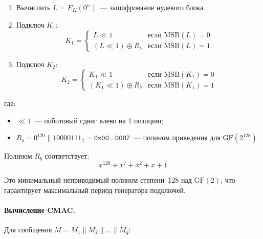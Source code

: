 \documentclass[a4paper,14pt]{extarticle}
\begin{document}
\begin{enumerate}
    \item Вычислить $L = E_K(0^n)$~--- зашифрование нулевого блока.
    \item Подключ $K_1$:
    \begin{equation}
        K_1 = \begin{cases}
            L \ll 1 & \text{если } \mathrm{MSB}(L) = 0 \\
            (L \ll 1) \oplus R_b & \text{если } \mathrm{MSB}(L) = 1
        \end{cases}
    \end{equation}
    \item Подключ $K_2$:
    \begin{equation}
        K_2 = \begin{cases}
            K_1 \ll 1 & \text{если } \mathrm{MSB}(K_1) = 0 \\
            (K_1 \ll 1) \oplus R_b & \text{если } \mathrm{MSB}(K_1) = 1
        \end{cases}
    \end{equation}
\end{enumerate}
где:
\begin{itemize}
    \item $\ll 1$~--- побитовый сдвиг влево на 1 позицию;
    \item $R_b = 0^{120} \| 10000111_2 = \texttt{0x00\ldots0087}$~--- полином приведения для $\mathrm{GF}(2^{128})$.
\end{itemize}

Полином $R_b$ соответствует:
\begin{equation}
    x^{128} + x^7 + x^2 + x + 1
\end{equation}

Это минимальный неприводимый полином степени~128 над $\mathrm{GF}(2)$, что гарантирует максимальный период генератора подключей.

\paragraph{Вычисление CMAC.}

Для сообщения $M = M_1 \| M_2 \| \ldots \| M_q$:
\end{document}
